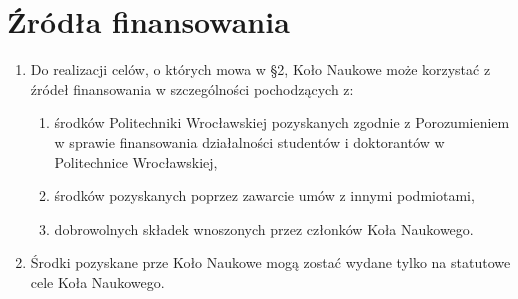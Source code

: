 \documentclass[12pt,a4paper]{article}
\begin{document}
\section{Źródła finansowania}
    \begin{enumerate}
        \item Do realizacji celów, o których mowa w \S 2, Koło Naukowe może korzystać z źródeł finansowania w szczególności pochodzących z:
            \begin{enumerate}
                \item środków Politechniki Wrocławskiej pozyskanych zgodnie z Porozumieniem w sprawie finansowania działalności studentów i doktorantów w Politechnice Wrocławskiej,
                \item środków pozyskanych poprzez zawarcie umów z innymi podmiotami,
                \item dobrowolnych składek wnoszonych przez członków Koła Naukowego.
            \end{enumerate}
        \item Środki pozyskane prze Koło Naukowe mogą zostać wydane tylko na statutowe cele Koła Naukowego.
    \end{enumerate}
\end{document}
